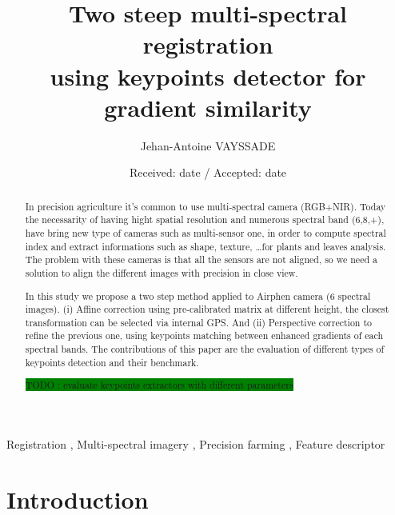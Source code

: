 \documentclass[]{elsarticle}
\begin{document}
	
	\onecolumn
	
	\begin{abstract}
		In precision agriculture it's common to use multi-spectral camera (RGB+NIR).
		Today the necessarity of having hight spatial resolution and numerous spectral band (6,8,+), have bring new type of cameras such as multi-sensor one,
		in order to compute spectral index and extract informations such as shape, texture, \dots for plants and leaves analysis.
		The problem with these cameras is that all the sensors are not aligned, so we need a solution to align the different images with precision in close view.
		
		In this study we propose a two step method applied to Airphen camera (6 spectral images).
		(i) Affine correction using pre-calibrated matrix at different height, the closest transformation can be selected via internal GPS.
		And (ii) Perspective correction to refine the previous one, using keypoints matching between enhanced gradients of each spectral bands.
		The contributions of this paper are the evaluation of different types of keypoints detection and their benchmark.
		
		\colorbox{green}{TODO : evaluate keypoints extractors with different parameters}
	\end{abstract}
	
	\begin{keyword}
		Registration \sep
		Multi-spectral imagery \sep
		Precision farming \sep
		Feature descriptor
	\end{keyword}
	
	\begin{frontmatter}
		\title{Two steep multi-spectral registration \\ using keypoints detector for gradient similarity}
		\author[unilu]{Jehan-Antoine VAYSSADE} 
		\address[myuni]{Agrosup D2A2E pole GestAd equipe agriculture de precision 21000 Dijon, France}
		\date{Received: date / Accepted: date}
	\end{frontmatter}
	
	\newpage
	\twocolumn
	
	\section{Introduction}
	
\end{document}
